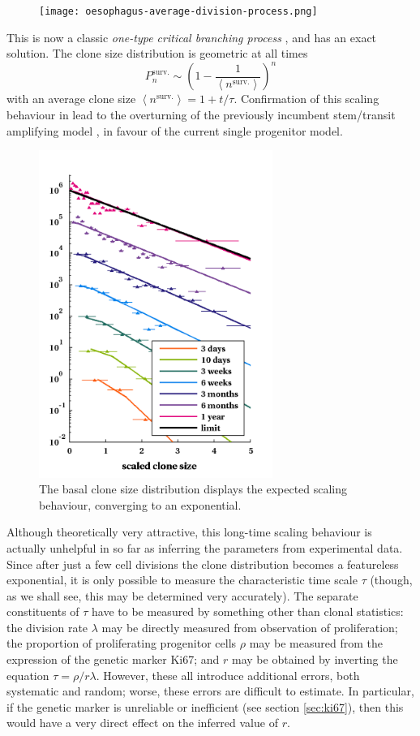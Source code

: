 \documentclass[10pt,english]{report}
\begin{document}
\begin{figure}[h]
	\centering
	\texttt{[image: oesophagus-average-division-process.png]}
\end{figure}

This is now a classic \emph{one-type critical branching process} \citep{athreya&ney}, and has an exact solution. The clone size distribution is geometric at all times $$P^\textrm{surv.}_n \sim \left(1-\frac{1}{\left\langle n^\textrm{surv.} \right\rangle}\right)^n$$ with an average clone size $\left\langle n^\textrm{surv.} \right\rangle = 1 + t/\tau$. Confirmation of this scaling behaviour in \citet{clayton} lead to the overturning of the previously incumbent stem/transit amplifying model \citep{stemta1,stemta2,stemta3}, in favour of the current single progenitor model.

\begin{figure}[htb]
	\centering
	\includegraphics[width=3in]{oes-scaling-b.png}
	\caption{The basal clone size distribution displays the expected scaling behaviour, converging to an exponential.}
\end{figure}


Although theoretically very attractive, this long-time scaling behaviour is actually unhelpful in so far as inferring the parameters from experimental data. Since after just a few cell divisions the clone distribution becomes a featureless exponential, it is only possible to measure the characteristic time scale $\tau$ (though, as we shall see, this may be determined very accurately). The separate constituents of $\tau$ have to be measured by something other than clonal statistics: the division rate $\lambda$ may be directly measured from observation of proliferation; the proportion of proliferating progenitor cells $\rho$ may be measured from the expression of the genetic marker Ki67; and $r$ may be obtained by inverting the equation $\tau = \rho/r\lambda$. However, these all introduce additional errors, both systematic and random; worse, these errors are difficult to estimate. In particular, if the genetic marker is unreliable or inefficient (see section \ref{sec:ki67}), then this would have a very direct effect on the inferred value of $r$.
\end{document}

